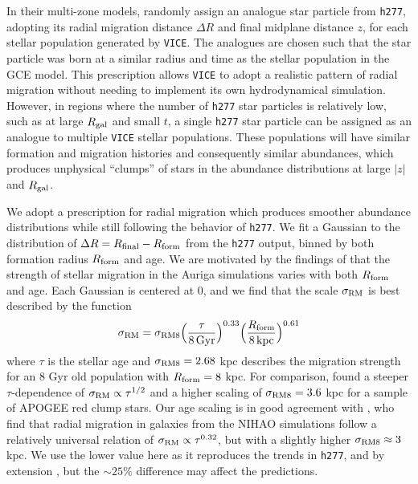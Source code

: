 \documentclass[twocolumn,twocolappendix,linenumbers]{aastex631}
\newcommand{\vice}{{\tt VICE}\xspace}
\newcommand{\hydro}{{\tt h277}\xspace}
\begin{document}
In their multi-zone models,  randomly assign an analogue star particle from \hydro, adopting its radial migration distance $\Delta R$ and final midplane distance $z$, for each stellar population generated by \vice. The analogues are chosen such that the star particle was born at a similar radius and time as the stellar population in the GCE model. This prescription allows \vice to adopt a realistic pattern of radial migration without needing to implement its own hydrodynamical simulation. However, in regions where the number of \hydro star particles is relatively low, such as at large $R_{\rm gal}$ and small $t$, a single \hydro star particle can be assigned as an analogue to multiple \vice stellar populations. These populations will have similar formation and migration histories and consequently similar abundances, which produces unphysical ``clumps'' of stars in the abundance distributions at large $|z|$ and $R_{\rm gal}$.

We adopt a prescription for radial migration which produces smoother abundance distributions while still following the behavior of \hydro. We fit a Gaussian to the distribution of $\Delta R = R_{\rm final} - R_{\rm form}$ from the \hydro output, binned by both formation radius $R_{\rm form}$ and age. We are motivated by the findings of \citet{Okalidis2022-AurigaMigration} that the strength of stellar migration in the Auriga simulations \citep{Grand2017-AurigaSims} varies with both $R_{\rm form}$ and age. Each Gaussian is centered at 0, and we find that the scale $\sigma_{\rm RM}$ is best described by the function
\begin{equation}
    \sigma_{\rm RM} = \sigma_{\rm RM8} \Big(\frac{\tau}{8\,{\rm Gyr}}\Big)^{0.33} \Big(\frac{R_{\rm form}}{8\,{\rm kpc}}\Big)^{0.61}
    \label{eq:radial-migration}
\end{equation}
where $\tau$ is the stellar age and $\sigma_{\rm RM8}=2.68$ kpc describes the migration strength for an 8 Gyr old population with $R_{\rm form}=8$ kpc. 
For comparison, \citet{Frankel2018-RadialMigration} found a steeper $\tau$-dependence of $\sigma_{\rm RM}\propto \tau^{1/2}$ and a higher scaling of $\sigma_{\rm RM8}=3.6$ kpc for a sample of APOGEE red clump stars.
Our age scaling is in good agreement with \citet{Lu2023-LMCStars}, who find that radial migration in galaxies from the NIHAO simulations \citep{Wang2015-NIHAOSims} follow a relatively universal relation of $\sigma_{\rm RM}\propto\tau^{0.32}$, but with a slightly higher $\sigma_{\rm RM8}\approx3$ kpc. We use the lower value here as it reproduces the trends in \hydro, and by extension , but the $\sim25\%$ difference may affect the predictions.
\end{document}
